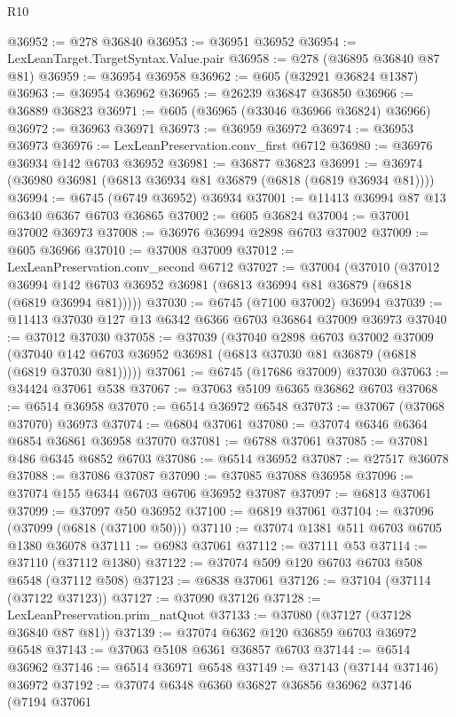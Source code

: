 \begin{lexlean}{R10}
\begin{coremodule}
@36952 := @278 @36840
@36953 := @36951 @36952
@36954 := LexLeanTarget.TargetSyntax.Value.pair
@36958 := @278 (@36895 @36840 @87 @81)
@36959 := @36954 @36958
@36962 := @605 (@32921 @36824 @1387)
@36963 := @36954 @36962
@36965 := @26239 @36847 @36850
@36966 := @36889 @36823
@36971 := @605 (@36965 (@33046 @36966 @36824) @36966)
@36972 := @36963 @36971
@36973 := @36959 @36972
@36974 := @36953 @36973
@36976 := LexLeanPreservation.conv_first @6712
@36980 := @36976 @36934 @142 @6703 @36952
@36981 := @36877 @36823
@36991 := @36974 (@36980 @36981 (@6813 @36934 @81 @36879 (@6818 (@6819 @36934 @81))))
@36994 := @6745 (@6749 @36952) @36934
@37001 := @11413 @36994 @87 @13 @6340 @6367 @6703 @36865
@37002 := @605 @36824
@37004 := @37001 @37002 @36973
@37008 := @36976 @36994 @2898 @6703 @37002
@37009 := @605 @36966
@37010 := @37008 @37009
@37012 := LexLeanPreservation.conv_second @6712
@37027 := @37004
    (@37010
      (@37012 @36994 @142 @6703 @36952 @36981 (@6813 @36994 @81 @36879 (@6818 (@6819 @36994 @81)))))
@37030 := @6745 (@7100 @37002) @36994
@37039 := @11413 @37030 @127 @13 @6342 @6366 @6703 @36864 @37009 @36973
@37040 := @37012 @37030
@37058 := @37039
    (@37040
      @2898
      @6703
      @37002
      @37009
      (@37040 @142 @6703 @36952 @36981 (@6813 @37030 @81 @36879 (@6818 (@6819 @37030 @81)))))
@37061 := @6745 (@17686 @37009) @37030
@37063 := @34424 @37061 @538
@37067 := @37063 @5109 @6365 @36862 @6703
@37068 := @6514 @36958
@37070 := @6514 @36972 @6548
@37073 := @37067 (@37068 @37070) @36973
@37074 := @6804 @37061
@37080 := @37074 @6346 @6364 @6854 @36861 @36958 @37070
@37081 := @6788 @37061
@37085 := @37081 @486 @6345 @6852 @6703
@37086 := @6514 @36952
@37087 := @27517 @36078
@37088 := @37086 @37087
@37090 := @37085 @37088 @36958
@37096 := @37074 @155 @6344 @6703 @6706 @36952 @37087
@37097 := @6813 @37061
@37099 := @37097 @50 @36952
@37100 := @6819 @37061
@37104 := @37096 (@37099 (@6818 (@37100 @50)))
@37110 := @37074 @1381 @511 @6703 @6705 @1380 @36078
@37111 := @6983 @37061
@37112 := @37111 @53
@37114 := @37110 (@37112 @1380)
@37122 := @37074 @509 @120 @6703 @6703 @508 @6548 (@37112 @508)
@37123 := @6838 @37061
@37126 := @37104 (@37114 (@37122 @37123))
@37127 := @37090 @37126
@37128 := LexLeanPreservation.prim_natQuot
@37133 := @37080 (@37127 (@37128 @36840 @87 @81))
@37139 := @37074 @6362 @120 @36859 @6703 @36972 @6548
@37143 := @37063 @5108 @6361 @36857 @6703
@37144 := @6514 @36962
@37146 := @6514 @36971 @6548
@37149 := @37143 (@37144 @37146) @36972
@37192 := @37074
    @6348
    @6360
    @36827
    @36856
    @36962
    @37146
    (@7194
      @37061

\end{coremodule}
\end{lexlean}

